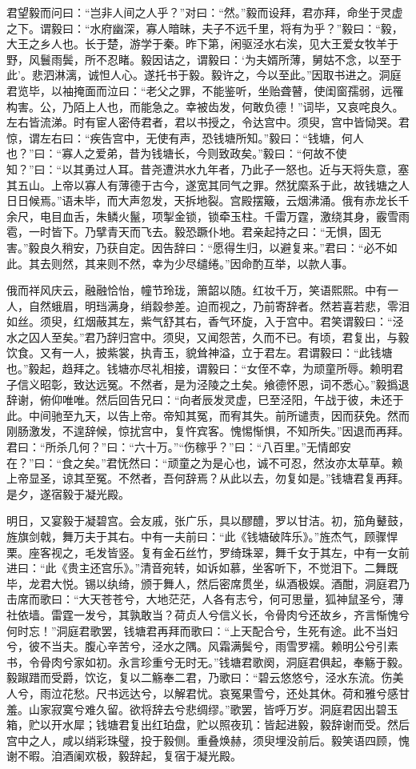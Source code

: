 \documentclass[UTF8,titlepage,oneside]{ctexbook}
\begin{document}
君望毅而问曰：“岂非人间之人乎？”对曰：“然。”毅而设拜，君亦拜，命坐于灵虚之下。谓毅曰：“水府幽深，寡人暗昧，夫子不远千里，将有为乎？”毅曰：“毅，大王之乡人也。长于楚，游学于秦。昨下第，闲驱泾水右涘，见大王爱女牧羊于野，风鬟雨鬓，所不忍睹。毅因诘之，谓毅曰：‘为夫婿所薄，舅姑不念，以至于此’。悲泗淋漓，诚怛人心。遂托书于毅。毅许之，今以至此。”因取书进之。洞庭君览毕，以袖掩面而泣曰：“老父之罪，不能鉴听，坐贻聋瞽，使闺窗孺弱，远罹构害。公，乃陌上人也，而能急之。幸被齿发，何敢负德！”词毕，又哀咤良久。左右皆流涕。时有宦人密侍君者，君以书授之，令达宫中。须臾，宫中皆恸哭。君惊，谓左右曰：“疾告宫中，无使有声，恐钱塘所知。”毅曰：“钱塘，何人也？”曰：“寡人之爱弟，昔为钱塘长，今则致政矣。”毅曰：“何故不使知？”曰：“以其勇过人耳。昔尧遭洪水九年者，乃此子一怒也。近与天将失意，塞其五山。上帝以寡人有薄德于古今，遂宽其同气之罪。然犹縻系于此，故钱塘之人日日候焉。”语未毕，而大声忽发，天拆地裂。宫殿摆簸，云烟沸涌。俄有赤龙长千余尺，电目血舌，朱鳞火鬣，项掣金锁，锁牵玉柱。千雷万霆，激绕其身，霰雪雨雹，一时皆下。乃擘青天而飞去。毅恐蹶仆地。君亲起持之曰：“无惧，固无害。”毅良久稍安，乃获自定。因告辞曰：“愿得生归，以避复来。”君曰：“必不如此。其去则然，其来则不然，幸为少尽缱绻。”因命酌互举，以款人事。

俄而祥风庆云，融融恰怡，幢节玲珑，箫韶以随。红妆千万，笑语熙熙。中有一人，自然蛾眉，明珰满身，绡縠参差。迫而视之，乃前寄辞者。然若喜若悲，零泪如丝。须臾，红烟蔽其左，紫气舒其右，香气环旋，入于宫中。君笑谓毅曰：“泾水之囚人至矣。”君乃辞归宫中。须臾，又闻怨苦，久而不已。有顷，君复出，与毅饮食。又有一人，披紫裳，执青玉，貌耸神溢，立于君左。君谓毅曰：“此钱塘也。”毅起，趋拜之。钱塘亦尽礼相接，谓毅曰：“女侄不幸，为顽童所辱。赖明君子信义昭彰，致达远冤。不然者，是为泾陵之土矣。飨德怀恩，词不悉心。”毅撝退辞谢，俯仰唯唯。然后回告兄曰：“向者辰发灵虚，巳至泾阳，午战于彼，未还于此。中间驰至九天，以告上帝。帝知其冤，而宥其失。前所谴责，因而获免。然而刚肠激发，不遑辞候，惊扰宫中，复忤宾客。愧惕惭惧，不知所失。”因退而再拜。君曰：“所杀几何？”曰：“六十万。”“伤稼乎？”曰：“八百里。”无情郎安在？”曰：“食之矣。”君怃然曰：“顽童之为是心也，诚不可忍，然汝亦太草草。赖上帝显圣，谅其至冤。不然者，吾何辞焉？从此以去，勿复如是。”钱塘君复再拜。是夕，遂宿毅于凝光殿。

明日，又宴毅于凝碧宫。会友戚，张广乐，具以醪醴，罗以甘洁。初，笳角鼙鼓，旌旗剑戟，舞万夫于其右。中有一夫前曰：“此《钱塘破阵乐》。”旌杰气，顾骤悍栗。座客视之，毛发皆竖。复有金石丝竹，罗绮珠翠，舞千女于其左，中有一女前进曰：“此《贵主还宫乐》。”清音宛转，如诉如慕，坐客听下，不觉泪下。二舞既毕，龙君大悦。锡以纨绮，颁于舞人，然后密席贯坐，纵酒极娱。酒酣，洞庭君乃击席而歌曰：“大天苍苍兮，大地茫茫，人各有志兮，何可思量，狐神鼠圣兮，薄社依墙。雷霆一发兮，其孰敢当？荷贞人兮信义长，令骨肉兮还故乡，齐言惭愧兮何时忘！”洞庭君歌罢，钱塘君再拜而歌曰：“上天配合兮，生死有途。此不当妇兮，彼不当夫。腹心辛苦兮，泾水之隅。风霜满鬓兮，雨雪罗襦。赖明公兮引素书，令骨肉兮家如初。永言珍重兮无时无。”钱塘君歌阕，洞庭君俱起，奉觞于毅。毅踧踖而受爵，饮讫，复以二觞奉二君，乃歌曰：“碧云悠悠兮，泾水东流。伤美人兮，雨泣花愁。尺书远达兮，以解君忧。哀冤果雪兮，还处其休。荷和雅兮感甘羞。山家寂寞兮难久留。欲将辞去兮悲绸缪。”歌罢，皆呼万岁。洞庭君因出碧玉箱，贮以开水犀；钱塘君复出红珀盘，贮以照夜玑：皆起进毅，毅辞谢而受。然后宫中之人，咸以绡彩珠璧，投于毅侧。重叠焕赫，须臾埋没前后。毅笑语四顾，愧谢不暇。洎酒阑欢极，毅辞起，复宿于凝光殿。
\end{document}
